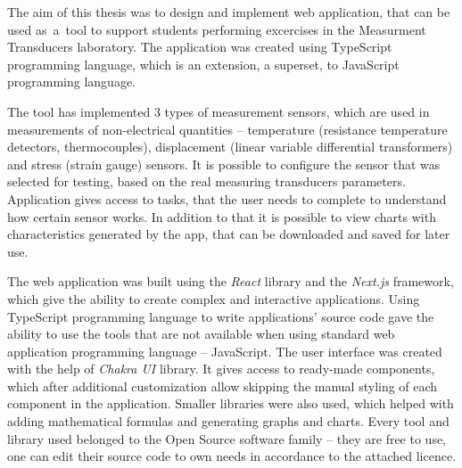 The aim of this thesis was to design and implement web application, that can be used as~a~tool to
support students performing excercises in the Measurment Transducers laboratory. The application was
created using TypeScript programming language, which is an extension, a superset, to JavaScript
programming language.

The tool has implemented 3 types of measurement sensors, which are used in measurements of
non-electrical quantities -- temperature (resistance temperature detectors, thermocouples),
displacement (linear variable differential transformers) and stress (strain gauge) sensors. It is
possible to configure the sensor that was selected for testing, based on the real measuring
transducers parameters. Application gives access to tasks, that the user needs to complete to
understand how certain sensor works. In addition to that it is possible to view charts with
characteristics generated by the app, that can be downloaded and saved for later use.

The web application was built using the \textit{React} library and the \textit{Next.js} framework,
which give the ability to create complex and interactive applications. Using TypeScript programming
language to write applications' source code gave the ability to use the tools that are not available
when using standard web application programming language -- JavaScript. The user interface was
created with the help of \textit{Chakra UI} library. It gives access to ready-made components, which
after additional customization allow skipping the manual styling of each component in the
application. Smaller libraries were also used, which helped with adding mathematical formulas and
generating graphs and charts. Every tool and library used belonged to the Open Source software
family -- they are free to use, one can edit their source code to own needs in accordance to the
attached licence.